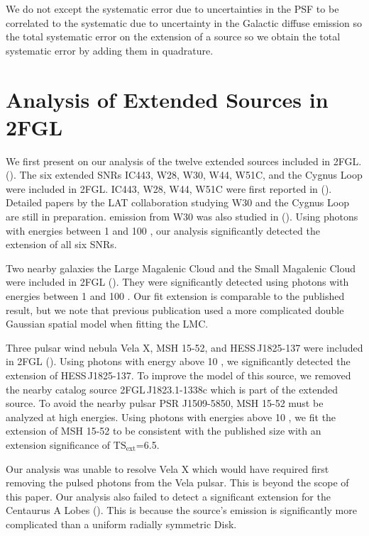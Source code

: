\documentclass[12pt,preprint]{aastex}
\newcommand{\gev}{\text{GeV}\xspace}
\newcommand{\tsext}{{\ensuremath{\text{TS}_{\text{ext}}}}\xspace}
\begin{document}
We do not except the systematic error due to uncertainties in the PSF to
be correlated to the systematic due to uncertainty in the Galactic diffuse
emission so the total systematic error on the extension of a source so
we obtain the total systematic error by adding them in quadrature.

\section{Analysis of Extended Sources in 2FGL}
\label{validate_known}


We first present on our analysis of the twelve extended sources
included in 2FGL.
(\cite{second_cat}).
The six extended SNRs IC443, W28, W30, W44, W51C, and the
Cygnus Loop were included in 2FGL.  IC443, W28, W44, W51C were
first reported in (\cite{ic443,w28,w44,w51c}).  Detailed papers
by the LAT collaboration studying W30 and the Cygnus Loop are
still in preparation.  \gev emission from W30 was also studied in
(\cite{castro_and_slane_2010}).  Using photons with energies between
1 \gev and 100 \gev, our analysis significantly detected the extension
of all six SNRs. 

Two nearby galaxies the Large Magalenic Cloud and the Small Magalenic
Cloud were included in 2FGL (\cite{lmc,smc}).  They were significantly
detected using photons with energies between 1 \gev and 100 \gev. Our
fit extension is comparable to the published result, but we note that
previous publication used a more complicated double Gaussian spatial
model when fitting the LMC.

Three pulsar wind nebula Vela X, MSH 15-52, and HESS\,J1825-137 were
included in 2FGL (\cite{velax,msh1552,fermi_hess_j1825}).  Using photons
with energy above 10 \gev, we significantly detected the extension of
HESS\,J1825-137.  To improve the model of this source, we removed the
nearby catalog source 2FGL\,J1823.1-1338c which is part of the extended
source.  To avoid the nearby pulsar PSR J1509-5850, MSH 15-52 must be
analyzed at high energies.  Using photons with energies above 10 \gev,
we fit the extension of MSH 15-52 to be consistent with the published
size with an extension significance of \tsext=6.5.  

Our analysis was unable to resolve Vela X which would have required first
removing the pulsed photons from the Vela pulsar. This is beyond the
scope of this paper.  Our analysis also failed to detect a significant
extension for the Centaurus A Lobes (\cite{cen_a_lat}). This is because
the source's emission is significantly more complicated than a uniform
radially symmetric Disk.
\end{document}
